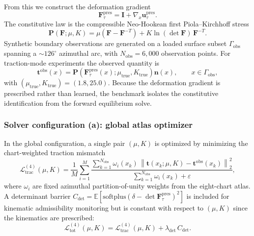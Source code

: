 \documentclass[sort&compress]{svjour3} %
\begin{document}
From this we construct the deformation gradient
\begin{equation}
\mathbf{F}_{\tau}^{\mathrm{pres}} = \mathbf{I} + \nabla_x \mathbf{u}_{\tau}^{\mathrm{pres}}.
\label{eq:torus_prescribed_F}
\end{equation}
The constitutive law is the compressible Neo-Hookean first Piola--Kirchhoff stress
\begin{equation}
\mathbf{P}(\mathbf{F};\mu,K)
=
\mu\left(\mathbf{F}-\mathbf{F}^{-T}\right)
+
K\ln(\det\mathbf{F})\,\mathbf{F}^{-T}.
\label{eq:nh_stress}
\end{equation}
Synthetic boundary observations are generated on a loaded surface subset $\Gamma_{\mathrm{obs}}$ spanning a ${\sim}126^{\circ}$ azimuthal arc, with $N_{\mathrm{obs}}=6{,}000$ observation points. For traction-mode experiments the observed quantity is
\begin{equation}
\mathbf{t}^{\mathrm{obs}}(x)
=
\mathbf{P}\!\left(\mathbf{F}_{\tau}^{\mathrm{pres}}(x);\mu_{\mathrm{true}},K_{\mathrm{true}}\right)\mathbf{n}(x),
\qquad x\in \Gamma_{\mathrm{obs}},
\label{eq:torus_obs_traction}
\end{equation}
with $(\mu_{\mathrm{true}},K_{\mathrm{true}})=(1.8,25.0)$. Because the deformation gradient is prescribed rather than learned, the benchmark isolates the constitutive identification from the forward equilibrium solve.

\subsubsection{Solver configuration (a): global atlas optimizer}

In the global configuration, a single pair $(\mu,K)$ is optimized by minimizing the chart-weighted traction mismatch
\begin{equation}
\mathcal{L}^{(4)}_{\mathrm{trac}}(\mu,K)
=
\frac{1}{M}\sum_{i=1}^{M}
\frac{\sum_{k=1}^{N_{\mathrm{obs}}}\omega_i(x_k)\,
\left\|
\mathbf{t}(x_k;\mu,K)-\mathbf{t}^{\mathrm{obs}}(x_k)
\right\|_2^2}
{\sum_{k=1}^{N_{\mathrm{obs}}}\omega_i(x_k)+\varepsilon},
\label{eq:torus_original_loss}
\end{equation}
where $\omega_i$ are fixed azimuthal partition-of-unity weights from the eight-chart atlas. A determinant barrier $C_{\det}=\mathbb{E}[\mathrm{softplus}(\delta-\det\mathbf{F}_{\tau}^{\mathrm{pres}})^2]$ is included for kinematic admissibility monitoring but is constant with respect to $(\mu,K)$ since the kinematics are prescribed:
\begin{equation}
\mathcal{L}^{(4)}_{\mathrm{tot}}(\mu,K)
=
\mathcal{L}^{(4)}_{\mathrm{trac}}(\mu,K)
+
\lambda_{\det}\,C_{\det}.
\label{eq:torus_original_total_loss}
\end{equation}
\end{document}
